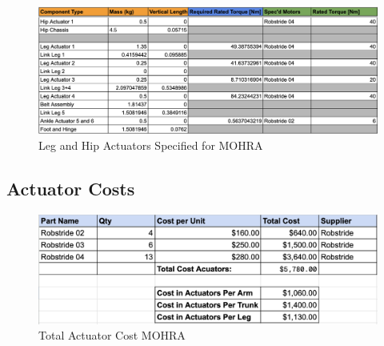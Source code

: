 \documentclass{article}
\begin{document}
\begin{figure}[H]
    \centering
    \includegraphics[scale=0.5]{assets/Design Presentation/Leg Rated Torque and Specs.png}
    \caption{Leg and Hip Actuators Specified for MOHRA}
    \label{fig:enter-label}
\end{figure}

\newpage
\subsection{Actuator Costs}
\begin{figure}[H]
    \centering
    \includegraphics[scale=0.5]{assets/Design Presentation/Actuator Cost.png}
    \caption{Total Actuator Cost MOHRA}
    \label{fig:enter-label}
\end{figure}
\end{document}
